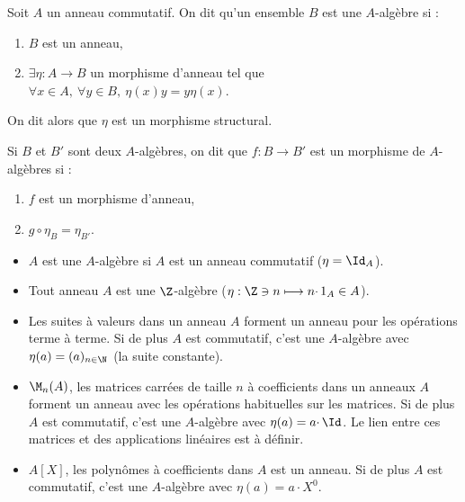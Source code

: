 \begin{defi}[$A$-Algèbre]
 
Soit $A$ un anneau commutatif. On dit qu'un ensemble $B$ est une $A$-algèbre si
:
\begin{enumerate}
 \item $B$ est un anneau,
 \item $\exists \eta : A \rightarrow B$ un morphisme d'anneau tel que
$\forall x \in A,\ \forall y \in B,\ \eta(x)y = y\eta(x)$.
\end{enumerate}

On dit alors que $\eta$ est un morphisme structural.
\end{defi}

\begin{defi}
 
Si $B$ et $B'$ sont deux $A$-algèbres, on dit que $f : B \rightarrow B'$ est
un morphisme de $A$-algèbres si :
\begin{enumerate}
 \item $f$ est un morphisme d'anneau,
 \item $g\circ \eta_B = \eta_{B'}$.
\end{enumerate}
\end{defi}

\begin{example}[Exemples]
\begin{itemize}
 \item $A$ est une $A$-algèbre si $A$ est un anneau commutatif ($\eta =
\Id_A$).
 \item Tout anneau $A$ est une $\Z$-algèbre ($\eta : \Z \owns n
\longmapsto n \cdotp 1_A \in A$).
 \item Les suites à valeurs dans un anneau $A$ forment un anneau pour les
opérations terme à terme. Si de plus $A$ est commutatif, c'est une $A$-algèbre
avec $\eta(a) = (a)_{n\in\N}$ (la suite constante).
 \item $\M_n(A)$, les matrices carrées de taille $n$ à coefficients dans un
anneaux $A$ forment un anneau avec les opérations habituelles sur les matrices.
Si de plus $A$ est commutatif, c'est une $A$-algèbre avec $\eta(a) =
a\cdotp\Id$. Le lien entre ces matrices et des applications linéaires est à
définir.
 \item $A[X]$, les polynômes à coefficients dans $A$ est un anneau. Si de plus
$A$ est commutatif, c'est une $A$-algèbre avec $\eta(a) = a\cdotp X^0$.
\end{itemize}
\end{example}

